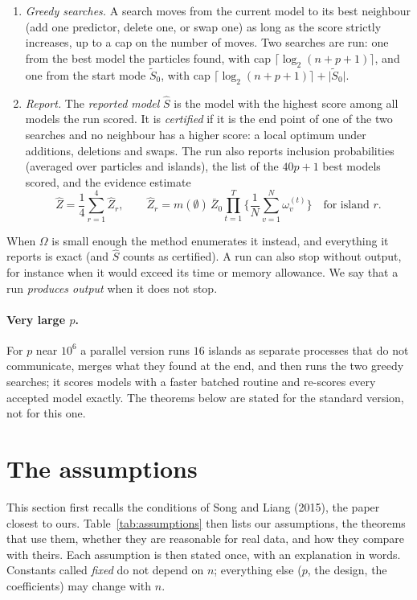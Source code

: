 \documentclass[11pt]{article}
\newcommand{\abs}[1]{\lvert #1\rvert}
\newcommand{\Om}{\Omega}
\newcommand{\Shat}{\hat S}
\newcommand{\Zhat}{\hat Z}
\newcommand{\tSz}{\tilde S_0}
\theoremstyle{plain}
\theoremstyle{definition}
\begin{document}
\begin{enumerate}
  \item \emph{Greedy searches.} A search moves from the current model to its best neighbour (add one predictor, delete
    one, or swap one) as long as the score strictly increases, up to a cap on the number of moves. Two searches are run:
    one from the best model the particles found, with cap $\lceil\log_2(n+p+1)\rceil$, and one from the start mode $\tSz$,
    with cap $\lceil\log_2(n+p+1)\rceil+\abs{\tSz}$.
  \item \emph{Report.} The \emph{reported model} $\Shat$ is the model with the highest score among all models the run
    scored. It is \emph{certified} if it is the end point of one of the two searches and no neighbour has a higher
    score: a local optimum under additions, deletions and swaps. The run also reports inclusion probabilities (averaged
    over particles and islands), the list of the $40p+1$ best models scored, and the evidence estimate
    \begin{equation}\label{eq:zhat}
      \Zhat=\frac14\sum_{r=1}^{4}\Zhat_r,\qquad
      \Zhat_r=m(\emptyset)\,\bar Z_0\prod_{t=1}^{T}\Big\{\frac1N\sum_{v=1}^N\omega^{(t)}_v\Big\}\quad\text{for island }r.
    \end{equation}
\end{enumerate}
When $\Om$ is small enough the method enumerates it instead, and everything it reports is exact (and $\Shat$ counts as
certified). A run can also stop without output, for instance when it would exceed its time or memory allowance. We say
that a run \emph{produces output} when it does not stop.

\paragraph{Very large $p$.} For $p$ near $10^6$ a parallel version runs $16$ islands as separate processes that do not
communicate, merges what they found at the end, and then runs the two greedy searches; it scores models with a faster
batched routine and re-scores every accepted model exactly. The theorems below are stated for the standard version, not
for this one.

\section{The assumptions}

This section first recalls the conditions of Song and Liang (2015), the paper closest to ours. Table~\ref{tab:assumptions}
then lists our assumptions, the theorems that use them, whether they are reasonable for real data, and how they compare
with theirs. Each assumption is then stated once, with an explanation in words. Constants called \emph{fixed} do not
depend on $n$; everything else ($p$, the design, the coefficients) may change with $n$.
\end{document}
